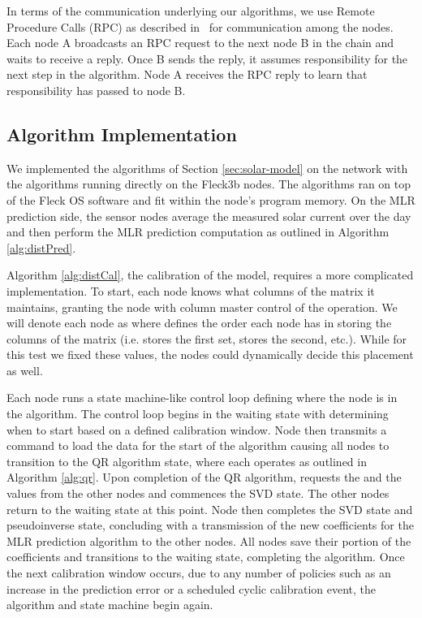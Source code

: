 \documentclass[prodmode,acmtosn]{acmsmall}
\begin{document}
In terms of the communication underlying our algorithms, we use Remote Procedure Calls (RPC) as described in~\cite{Corke_pieee10} for communication among the nodes.
Each node A broadcasts an RPC request to the next node B in the chain and waits to receive a reply.
Once B sends the reply, it assumes responsibility for the next step in the algorithm.
Node A receives the RPC reply to learn that responsibility has passed to node B.\newline

\subsection{Algorithm Implementation}
We implemented the algorithms of Section \ref{sec:solar-model} on the network with the algorithms running directly on the Fleck\texttrademark3b nodes.
The algorithms ran on top of the Fleck OS software and fit within the node's program memory.
On the MLR prediction side, the sensor nodes average the measured solar current over the day and then perform the MLR prediction computation as outlined in Algorithm \ref{alg:distPred}.

Algorithm \ref{alg:distCal}, the calibration of the model, requires a more complicated implementation.
To start, each node knows what columns of the matrix it maintains, granting the node with column  master control of the operation.
We will denote each node as  where  defines the order each node has in storing the columns of the matrix (i.e.  stores the first set,  stores the second, etc.).
While for this test we fixed these values, the nodes could dynamically decide this placement as well.

Each node runs a state machine-like control loop defining where the node is in the algorithm.
The control loop begins in the waiting state with  determining when to start based on a defined calibration window.
Node  then transmits a command to load the data for the start of the algorithm causing all nodes to transition to the QR algorithm state, where each operates as outlined in Algorithm \ref{alg:qr}.
Upon completion of the QR algorithm,  requests the  and the  values from the other nodes and commences the SVD state.
The other nodes return to the waiting state at this point.
Node  then completes the SVD state and pseudoinverse state, concluding with a transmission of the new coefficients for the MLR prediction algorithm to the other nodes.
All nodes save their portion of the coefficients and  transitions to the waiting state, completing the algorithm.
Once the next calibration window occurs, due to any number of policies such as an increase in the prediction error or a scheduled cyclic calibration event, the algorithm and state machine begin again.
\end{document}
